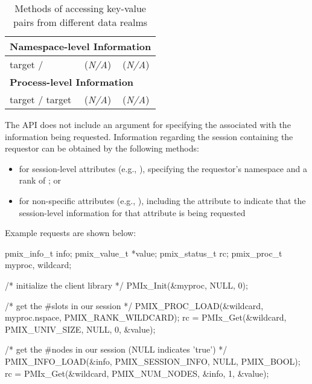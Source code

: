 \begin{table}[htb]
\begin{tabular}{| l | l | l |}
       \hline
       \hline
       \multicolumn{3}{|l|}{\textbf{Namespace-level Information}} \\
       \hline
       target / {PMIX_RANK_WILDCARD} &   (\emph{N/A})                & (\emph{N/A}) \\
       \hline
       \hline
       \multicolumn{3}{|l|}{\textbf{Process-level Information}} \\
       \hline
       target / target   &    (\emph{N/A})               & (\emph{N/A}) \\
       \hline
\end{tabular}
\caption{Methods of accessing key-value pairs from different data realms}
\label{tab:key-value-realms}
\end{table}


The  \ac{API} does not include an argument for specifying the  associated with the information being requested. Information regarding the session containing the requestor can be obtained by the following methods:

\begin{itemize}
\item for session-level attributes (e.g., ), specifying the requestor's namespace and a rank of ; or
\item for non-specific attributes (e.g., ), including the  attribute to indicate that the session-level information for that attribute is being requested
\end{itemize}

Example requests are shown below:

\cspecificstart
\begin{codepar}
pmix_info_t info;
pmix_value_t *value;
pmix_status_t rc;
pmix_proc_t myproc, wildcard;

/* initialize the client library */
PMIx_Init(&myproc, NULL, 0);

/* get the #slots in our session */
PMIX_PROC_LOAD(&wildcard, myproc.nspace, PMIX_RANK_WILDCARD);
rc = PMIx_Get(&wildcard, PMIX_UNIV_SIZE, NULL, 0, &value);

/* get the #nodes in our session (NULL indicates 'true') */
PMIX_INFO_LOAD(&info, PMIX_SESSION_INFO, NULL, PMIX_BOOL);
rc = PMIx_Get(&wildcard, PMIX_NUM_NODES, &info, 1, &value);
\end{codepar}
\cspecificend

